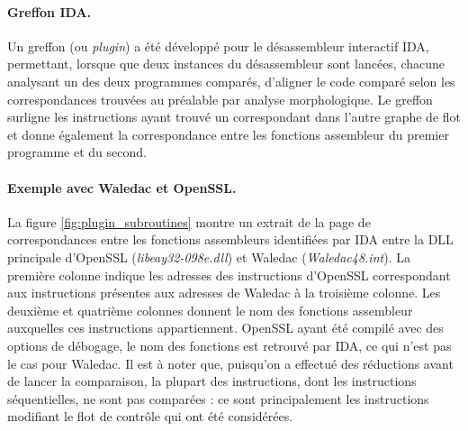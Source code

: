 \paragraph{Greffon IDA.}
Un greffon (ou \emph{plugin}) a été développé pour le désassembleur interactif IDA, permettant, lorsque que deux instances du désassembleur sont lancées, chacune analysant un des deux programmes comparés, d'aligner le code comparé selon les correspondances trouvées au préalable par analyse morphologique.
Le greffon surligne les instructions ayant trouvé un correspondant dans l'autre graphe de flot et donne également la correspondance entre les fonctions assembleur du premier programme et du second.

\paragraph{Exemple avec Waledac et OpenSSL.}
La figure \ref{fig:plugin_subroutines} montre un extrait de la page de correspondances entre les fonctions assembleurs identifiées par IDA entre la DLL principale d'OpenSSL (\emph{libeay32-098e.dll}) et Waledac (\emph{Waledac48.int}). La première colonne indique les adresses des instructions d'OpenSSL correspondant aux instructions présentes aux adresses de Waledac à la troisième colonne. Les deuxième et quatrième colonnes donnent le nom des fonctions assembleur auxquelles ces instructions appartiennent.
OpenSSL ayant été compilé avec des options de débogage, le nom des fonctions est retrouvé par IDA, ce qui n'est pas le cas pour Waledac.
Il est à noter que, puisqu'on a effectué des réductions avant de lancer la comparaison, la plupart des instructions, dont les instructions séquentielles, ne sont pas comparées : ce sont principalement les instructions modifiant le flot de contrôle qui ont été considérées.


